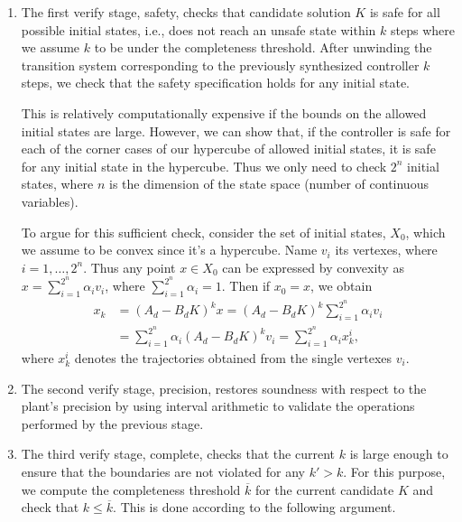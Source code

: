 \documentclass[runningheads,a4paper]{llncs}
\begin{document}
\begin{enumerate}
\item The first {\sc verify} stage, {\sc safety}, checks that candidate
solution $K$ is safe for all possible initial states, i.e., does not reach an unsafe
state within $k$ steps where we assume $k$ to be under the completeness threshold. 
After unwinding the transition system corresponding to the previously synthesized controller
$k$ steps, we check that the safety specification holds for any initial state. 

This is relatively computationally expensive if the bounds on the
allowed initial states are large.  However, we can show that, if the
controller is safe for each of the corner cases of our hypercube of
allowed initial states, it is safe for any initial state in the
hypercube. Thus we only need to check $2^n$ initial states, where $n$
is the dimension of the state space (number of continuous variables). 

To argue for this sufficient check, 
consider the set of initial states, $X_0$, which we assume to be convex since it's a hypercube. 
Name $v_i$ its vertexes, where $i=1,\ldots, 2^n$.  
Thus any point $x \in X_0$ can be expressed by convexity as $x = \sum_{i=1}^{2^n} \alpha_i v_i$, 
where $\sum_{i=1}^{2^n} \alpha_i =1$. Then if $x_0=x$, we obtain 
\begin{align*}
x_k   &= (A_d - B_d K)^k x = (A_d - B_d K)^k \sum_{i=1}^{2^n} \alpha_i v_i \\
      &= \sum_{i=1}^{2^n} \alpha_i (A_d - B_d K)^k v_i = \sum_{i=1}^{2^n} \alpha_i x_k^i, 
 \end{align*}     
where $x_k^i$ denotes the trajectories obtained from the single vertexes $v_i$. 

\item The second {\sc verify} stage, {\sc precision}, 
 restores soundness with respect to the plant's precision
by using interval arithmetic \cite{moore1966interval} to validate the 
operations performed by the previous stage. 

\item The third {\sc verify} stage, {\sc complete}, checks that the
current $k$ is large enough to ensure that the boundaries are not
violated for any $k'{>}k$.  For this purpose, we compute the
completeness threshold $\overline{k}$ for the current candidate $K$
and check that $k{\leq}\overline{k}$. This is done according to the following argument.  


\end{enumerate}
\end{document}
